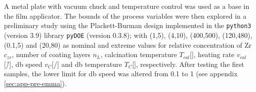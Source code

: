 A metal plate with vacuum chuck and temperature control was used as a base in the film applicator. 
The bounds of the process variables were then explored in a preliminary study 
using the Plackett-Burman\cite{Plackett1946} design implemented in the \texttt{python3} (version 3.9)
library \texttt{pyDOE} (version 0.3.8); 
with 
(1,5), (4,10), (400,500), (120,480), (0.1,5) and  (20,80) 
as nominal and extreme values for 
relative concentration of Zr $c_{zr}$, number of coating layers $n_L$, calcination temperature $T_{cal}$[\oc{}], heating rate $v_{cal}$[\oc{}/\h{}], \gls{db} speed $v_{C}$[\mm{}/\s{}] and \gls{db} temperature $T_{C}$[\oc{}], respectively.
After testing the first samples, the lower limit for \gls{db} speed was altered from 0.1 to 1 (see appendix \ref{sec:app-pre-emma}).
%
